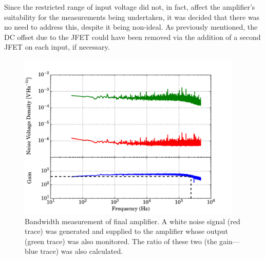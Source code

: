 \par 
Since the restricted range of input voltage did not, in fact, affect the amplifier's suitability for the measurements being undertaken, it was decided that there was no need to address this, despite it being non-ideal. As previously mentioned, the DC offset due to the JFET could have been removed via the addition of a second JFET on each input, if necessary.
\begin{figure}[ht]
\begin{center}
\includegraphics[width = 0.95\textwidth]{figures/final_amp_BW}
\caption[Bandwidth measurement of final amplifier]{Bandwidth measurement of final amplifier. A white noise signal (red trace) was generated and supplied to the amplifier whose output (green trace) was also monitored. The ratio of these two (the gain---blue trace) was also calculated.}
\label{fig:finalAmp_BW}
\end{center}
\end{figure}
\par 
